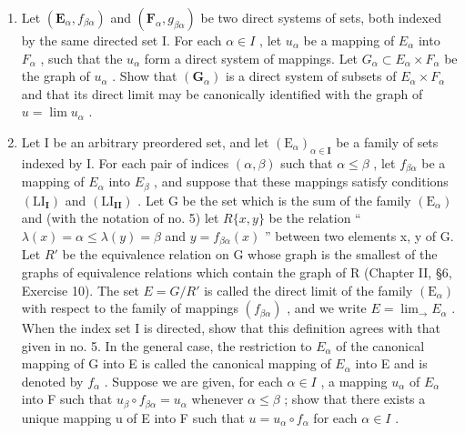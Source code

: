 \begin{enumerate}
\def\labelenumi{\arabic{enumi}.}
\setcounter{enumi}{7}
\item
  Let \((\mathbf{E}_{\alpha}, f_{\beta\alpha})\) and \((\mathbf{F}_{\alpha}, g_{\beta\alpha})\) be two direct systems of sets, both indexed by the same directed set I. For each \(\alpha \in I\) , let \(u_{\alpha}\) be a mapping of \(E_{\alpha}\) into \(F_{\alpha}\) , such that the \(u_{\alpha}\) form a direct system of mappings. Let \(G_{\alpha} \subset E_{\alpha} \times F_{\alpha}\) be the graph of \(u_{\alpha}\) . Show that \((\mathbf{G}_{\alpha})\) is a direct system of subsets of \(E_{\alpha} \times F_{\alpha}\) and that its direct limit may be canonically identified with the graph of \(u = \lim u_{\alpha}\) .
\item
  Let I be an arbitrary preordered set, and let \((\mathrm{E}_{\alpha})_{\alpha\in\mathbf{I}}\) be a family of sets indexed by I. For each pair of indices \((\alpha,\beta)\) such that \(\alpha\leqslant\beta\) , let \(f_{\beta\alpha}\) be a mapping of \(E_{\alpha}\) into \(E_{\beta}\) , and suppose that these mappings satisfy conditions \((\mathrm{LI}_{\mathbf{I}})\) and \((\mathrm{LI}_{\mathbf{II}})\) . Let G be the set which is the sum of the family \((\mathrm{E}_{\alpha})\) and (with the notation of no. 5) let \(R\{x,y\}\) be the relation `` \(\lambda(x)=\alpha\leqslant\lambda(y)=\beta\) and \(y=f_{\beta\alpha}(x)\) '' between two elements x, y of G. Let \(R'\) be the equivalence relation on G whose graph is the smallest of the graphs of equivalence relations which contain the graph of R (Chapter II, §6, Exercise 10). The set \(E=G/R'\) is called the direct limit of the family \((\mathrm{E}_{\alpha})\) with respect to the family of mappings \((f_{\beta\alpha})\) , and we write \(E=\lim_{\rightarrow}E_{\alpha}\) . When the index set I is directed, show that this definition agrees with that given in no. 5. In the general case, the restriction to \(E_{\alpha}\) of the canonical mapping of G into E is called the canonical mapping of \(E_{\alpha}\) into E and is denoted by \(f_{\alpha}\) . Suppose we are given, for each \(\alpha\in I\) , a mapping \(u_{\alpha}\) of \(E_{\alpha}\) into F such that \(u_{\beta}\circ f_{\beta\alpha}=u_{\alpha}\) whenever \(\alpha\leqslant\beta\) ; show that there exists a unique mapping u of E into F such that \(u=u_{\alpha}\circ f_{\alpha}\) for each \(\alpha\in I\) .
\end{enumerate}
